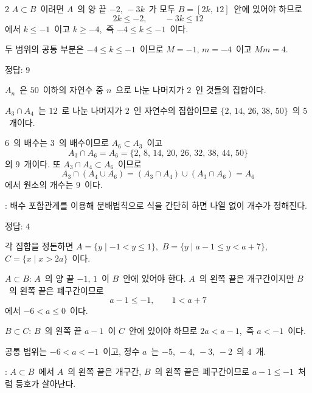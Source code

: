 \documentclass[10pt,fleqn]{article}
\begin{document}
\begin{multicols*}{2}
$A\subset B$\ 이려면 $A$\ 의 양 끝 $-2,\,-3k$\ 가 모두 $B=[2k,\,12]$\ 안에 있어야 하므로
\[ 2k\le -2,\qquad -3k\le 12 \]
에서 $k\le -1$\ 이고 $k\ge -4$,\ 즉 $-4\le k\le -1$\ 이다.

두 범위의 공통 부분은 $-4\le k\le -1$\ 이므로 $M=-1,\,m=-4$\ 이고 $Mm=4$.

\begin{dmanswerbox}
정답: $9$
\end{dmanswerbox}

$A_{n}$\ 은 $50$\ 이하의 자연수 중 $n$\ 으로 나눈 나머지가 $2$\ 인 것들의 집합이다.

$A_{3}\cap A_{4}$\ 는 $12$\ 로 나눈 나머지가 $2$\ 인 자연수의 집합이므로 $\{2,\,14,\,26,\,38,\,50\}$\ 의 $5$\ 개이다.

$6$\ 의 배수는 $3$\ 의 배수이므로 $A_{6}\subset A_{3}$\ 이고
\[ A_{3}\cap A_{6}=A_{6}=\{2,\,8,\,14,\,20,\,26,\,32,\,38,\,44,\,50\} \]
의 $9$\ 개이다. 또 $A_{3}\cap A_{4}\subset A_{6}$\ 이므로
\[ A_{3}\cap(A_{4}\cup A_{6})=(A_{3}\cap A_{4})\cup(A_{3}\cap A_{6})=A_{6} \]
에서 원소의 개수는 $9$\ 이다.

\begin{dmcriticalpoint}
: 배수 포함관계를 이용해 분배법칙으로 식을 간단히 하면 나열 없이 개수가 정해진다.
\end{dmcriticalpoint}

\begin{dmanswerbox}
정답: $4$
\end{dmanswerbox}

각 집합을 정돈하면 $A=\{y\mid -1<y\le 1\}$,\ $B=\{y\mid a-1\le y<a+7\}$,\ $C=\{x\mid x>2a\}$\ 이다.

$A\subset B$: $A$\ 의 양 끝 $-1,\,1$\ 이 $B$\ 안에 있어야 한다. $A$\ 의 왼쪽 끝은 개구간이지만 $B$\ 의 왼쪽 끝은 폐구간이므로
\[ a-1\le -1,\qquad 1<a+7 \]
에서 $-6<a\le 0$\ 이다.

$B\subset C$: $B$\ 의 왼쪽 끝 $a-1$\ 이 $C$\ 안에 있어야 하므로 $2a<a-1$,\ 즉 $a<-1$\ 이다.

공통 범위는 $-6<a<-1$\ 이고, 정수 $a$\ 는 $-5,\,-4,\,-3,\,-2$\ 의 $4$\ 개.

\begin{dmcriticalpoint}
: $A\subset B$\ 에서 $A$\ 의 왼쪽 끝은 개구간, $B$\ 의 왼쪽 끝은 폐구간이므로 $a-1 \le -1$\ 처럼 등호가 살아난다.
\end{dmcriticalpoint}


\end{multicols*}
\end{document}
